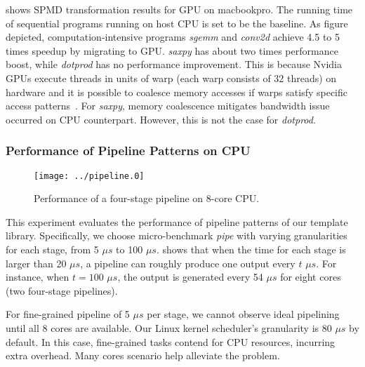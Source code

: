  shows SPMD transformation results for GPU on
macbookpro. The running time of sequential programs running on host CPU is set to
be the baseline.
As figure depicted,  computation-intensive programs
\textit{sgemm} and \textit{conv2d} achieve 4.5 to 5 times speedup
by migrating to GPU.
\textit{saxpy} has about two times performance boost, while \textit{dotprod}
has no performance improvement. This is because
Nvidia GPUs execute threads in units of warp (each warp consists of 32 threads) on hardware and it is
possible to coalesce memory accesses if warps satisfy
specific access patterns~\cite{nvopencl}. For \textit{saxpy}, memory coalescence
mitigates bandwidth issue occurred on CPU counterpart. However, this is not
the case for \textit{dotprod}.

\subsubsection{Performance of Pipeline Patterns on CPU}
\label{exp:4}

\begin{figure}[htp]
\texttt{[image: ../pipeline.0]}
\caption{Performance of a four-stage pipeline on 8-core CPU.}
\label{fig:pipe}
\end{figure}

This experiment evaluates the performance of pipeline patterns of our template
library. Specifically, we choose micro-benchmark \textit{pipe} with varying
granularities for each stage, from 5 $\mu s$ to 100 $\mu s$.  shows
that when the time for each stage is larger than 20 $\mu s$, a pipeline can
roughly produce one output every $t$ $\mu s$. For instance, when $t=100$ $\mu s$,
the output is generated every 54 $\mu s$ for eight cores (two four-stage pipelines).

For fine-grained pipeline of 5 $\mu s$ per stage, we cannot observe ideal pipelining until all 8
cores are available.  Our Linux kernel scheduler's granularity is 80
$\mu s$ by default. In this case, fine-grained tasks contend for
CPU resources, incurring extra overhead. Many cores scenario help alleviate the
problem.

